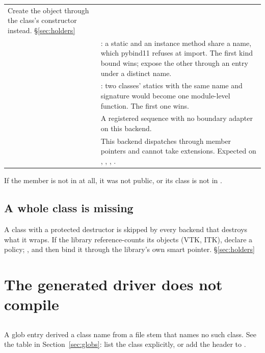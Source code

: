 \begin{center}
\begin{tabular}{@{}lL{9.0cm}@{}}
  Create the object through the class's constructor instead.
  \S\ref{sec:holders} \\
\addlinespace
{} &
  : a static and an instance method share a name, which pybind11
  refuses at import. The first kind bound wins; expose the other through an
   entry under a distinct name. \\
\addlinespace
{} &
  : two classes' statics with the same name and signature would
  become one module-level function. The first one wins. \\
\addlinespace
{} &
  A registered sequence with no  boundary adapter on this
  backend. \\
\addlinespace
{} &
  This backend dispatches through member pointers and cannot take extensions.
  Expected on , , , . \\
\bottomrule
\end{tabular}
\end{center}

If the member is not in  at all, it was not public, or its
class is not in .

\subsection*{A whole class is missing}

A class with a protected destructor is skipped by every backend that destroys
what it wraps. If the library reference-counts its objects (VTK, ITK), declare a
 policy; ,  and  then bind
it through the library's own smart pointer. \S\ref{sec:holders}

\section{The generated driver does not compile}

\subsection*{}

A glob entry derived a class name from a file stem that names no such class.
See the table in Section~\ref{sec:globs}: list the class explicitly, or add the
header to .

